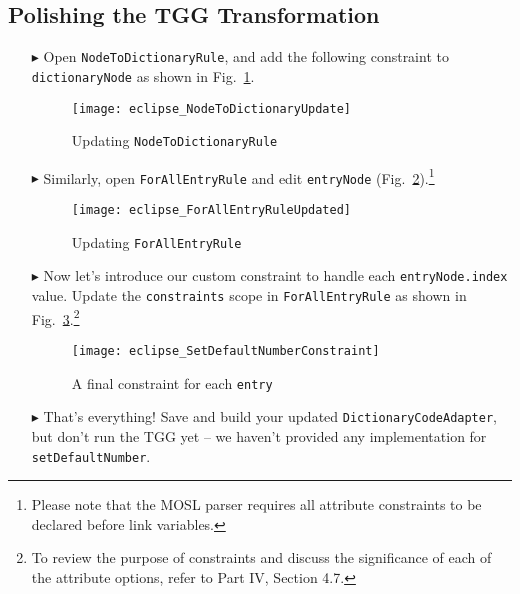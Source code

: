\newpage
\hypertarget{m2ttex}{}
\subsection{Polishing the TGG Transformation}
\texHeader

\begin{itemize}

\item[$\blacktriangleright$] Open \texttt{NodeToDictionaryRule}, and add the following constraint to \texttt{dictionaryNode} as shown in
Fig.~\ref{eclipse:NodeToDictionaryRuleUpdated}.

\vspace{0.5cm}

\begin{figure}[htp]
\begin{center}
  \texttt{[image: eclipse\_NodeToDictionaryUpdate]}
  \caption[labelInTOC]{Updating \texttt{NodeToDictionaryRule}}
  \label{eclipse:NodeToDictionaryRuleUpdated}
\end{center}
\end{figure}


\item[$\blacktriangleright$] Similarly, open \texttt{ForAllEntryRule} and edit \texttt{entryNode} (Fig.~\ref{eclipse:ForAllEntryRuleUpdated}).\footnote{Please
note that the MOSL parser requires all attribute constraints to be declared before link variables.}

\vspace{0.5cm}

\begin{figure}[htp]
\begin{center}
  \texttt{[image: eclipse\_ForAllEntryRuleUpdated]}
  \caption[labelInTOC]{Updating \texttt{ForAllEntryRule}}
  \label{eclipse:ForAllEntryRuleUpdated}
\end{center}
\end{figure} 

\item[$\blacktriangleright$] Now let's introduce our custom constraint to handle each \texttt{entryNode.index}
value. Update the \texttt{constraints} scope in \texttt{ForAllEntryRule} as shown in Fig.~\ref{eclipse:newEntryConstraint}.\footnote{ To review the purpose of
constraints and discuss the significance of each of the attribute options, refer to Part IV, Section 4.7.}

\vspace{0.5cm}

\begin{figure}[htbp]
\begin{center}
  \texttt{[image: eclipse\_SetDefaultNumberConstraint]}
  \caption{A final constraint for each \texttt{entry}}
  \label{eclipse:newEntryConstraint}
\end{center}
\end{figure}

\item[$\blacktriangleright$] That's everything! Save and build your updated \texttt{DictionaryCodeAdapter}, but don't run the TGG yet -- we haven't provided any
implementation for \texttt{setDefaultNumber}.

\end{itemize}
